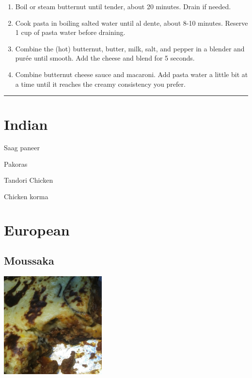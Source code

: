 \documentclass[
]{book}
\begin{document}
\begin{enumerate}
\def\labelenumi{\arabic{enumi}.}
\item
  Boil or steam butternut until tender, about 20 minutes. Drain if needed.
\item
  Cook pasta in boiling salted water until al dente, about 8-10 minutes. Reserve 1 cup of pasta water before draining.
\item
  Combine the (hot) butternut, butter, milk, salt, and pepper in a blender and purée until smooth. Add the cheese and blend for 5 seconds.
\item
  Combine butternut cheese sauce and macaroni. Add pasta water a little bit at a time until it reaches the creamy consistency you prefer.
\end{enumerate}

\begin{center}\rule{0.5\linewidth}{0.5pt}\end{center}

\hypertarget{indian}{%
\section*{Indian}\label{indian}}

Saag paneer

Pakoras

Tandori Chicken

Chicken korma

\hypertarget{european}{%
\section*{European}\label{european}}

\hypertarget{moussaka}{%
\subsection*{Moussaka}\label{moussaka}}

\includegraphics[width=0.4\textwidth,height=\textheight]{moussaka_small.jpg}
\end{document}
